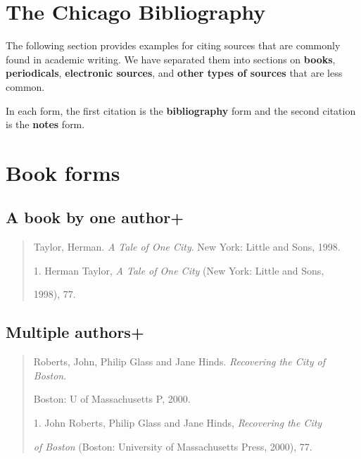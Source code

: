 

\section{The Chicago Bibliography}

The following section provides examples for citing sources that are commonly found in
academic writing. We have separated them into sections on \textbf{books}, \textbf{periodicals}, \textbf{electronic
sources}, and \textbf{other types of sources} that are less common.

In each form, the first citation is the \textbf{bibliography} form and the second citation is the \textbf{notes} form.


\section{Book forms}

\subsection{A book by one author+}

\begin{quote}

Taylor, Herman. \emph{A Tale of One City}. New York: Little and Sons, 1998.

\medskip

\hspace{.4in}1. Herman Taylor, \emph{A Tale of One City} (New York: Little and Sons, 

1998), 77.
\end{quote}


\subsection{Multiple authors+}

\begin{quote}

Roberts, John, Philip Glass and Jane Hinds. \emph{Recovering the City of Boston}. 

\hspace{.4in}Boston: U of Massachusetts P, 2000.


\medskip

\hspace{.4in}1. John Roberts, Philip Glass and Jane Hinds, \emph{Recovering the City}

\emph{of Boston} (Boston: University of Massachusetts Press, 2000), 77.
\end{quote}

